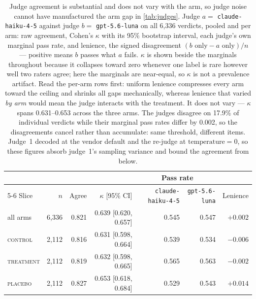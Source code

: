 \begin{table}[t]
  \centering\footnotesize
  \begin{tabular}{@{}lrrrrrr@{}}
    \toprule
    & & & & \multicolumn{2}{c}{Pass rate} & \\
    \cmidrule(lr){5-6}
    Slice & $n$ & Agree & $\kappa$ [95\% CI] & \texttt{claude-haiku-4-5} & \texttt{gpt-5.6-luna} & Lenience \\
    \midrule
    all arms & 6,336 & 0.821 & 0.639 [0.620, 0.657] & 0.545 & 0.547 & $+0.002$ \\
    \addlinespace
    \textsc{control} & 2,112 & 0.816 & 0.631 [0.598, 0.664] & 0.539 & 0.534 & $-0.006$ \\
    \textsc{treatment} & 2,112 & 0.819 & 0.632 [0.598, 0.665] & 0.565 & 0.563 & $-0.002$ \\
    \textsc{placebo} & 2,112 & 0.827 & 0.653 [0.618, 0.684] & 0.529 & 0.543 & $+0.014$ \\
    \bottomrule
  \end{tabular}
  \caption{
    Judge agreement is substantial and does not vary with the arm, so judge noise cannot have
    manufactured the arm gap in \autoref{tab:judges}. Judge $a = $ \texttt{claude-haiku-4-5} against judge
    $b = $ \texttt{gpt-5.6-luna} on all 6,336 verdicts, pooled and per arm: raw agreement, Cohen's
    $\kappa$ with its 95\% bootstrap interval, each judge's own marginal pass rate, and lenience,
    the signed disagreement $(b\text{ only} - a\text{ only})/n$ --- positive means $b$ passes what
    $a$ fails. $\kappa$ is shown beside the marginals throughout because it collapses toward zero
    whenever one label is rare however well two raters agree; here the marginals are near-equal, so
    $\kappa$ is not a prevalence artifact. Read the per-arm rows first: uniform lenience compresses
    every arm toward the ceiling and shrinks all gaps mechanically, whereas lenience that varied
    \emph{by arm} would mean the judge interacts with the treatment. It does not vary --- $\kappa$
    spans 0.631--0.653 across the three arms. The judges disagree on
    17.9\% of individual verdicts while their marginal pass rates differ by
    0.002, so the disagreements cancel rather than accumulate: same threshold,
    different items. Judge~1 decoded at the vendor default and the re-judge at
    $\text{temperature}{=}0$, so these figures absorb judge~1's sampling variance and bound the
    agreement from below.
  }
  \label{tab:judgeagreement}
\end{table}

